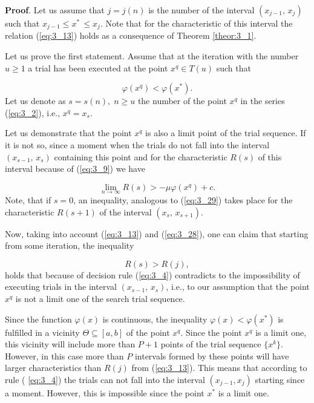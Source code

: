 	\textbf{Proof}. Let us assume that $j=j(n)$ is the number of the interval $(x_{j-1} ,\, x_{j} )$ such that $x_{j-1} \le x^{*} \, \le x_{j} $. Note that for the characteristic of this interval the relation  (\ref{eq:3_13}) holds as a consequence of Theorem \ref{theor:3_1}.
	
	Let us prove the first statement. Assume that at the iteration with the number $u\ge 1$ a trial has been executed at the point $x^{q} \in T(u)$ such that 
	
	\begin{equation}
	\label{eq:3_28}
	\varphi (x^{q} )<\varphi (x^{*} ).
	\end{equation}
	Let us denote as $s=s(n),\; n\ge u$ the number of the point $x^{q} $ in the series  (\ref{eq:3_2}), i.e., $x^{q} =x_{s} $. 
	
	Let us demonstrate that the point $x^{q} $ is also a limit point of the trial sequence. If it is not so, since a moment when the trials do not fall into the interval $(x_{s-1} ,\, x_{s} )$ containing this point and for the characteristic $R(s)$ of this interval because of  (\ref{eq:3_9}) we have
	
	\begin{equation}
	\label{eq:3_29}
	\mathop{\lim }\limits_{n\to \infty } R(s)>-\mu \varphi (x^{q} )+c.
	\end{equation}
	Note, that if $s=0$, an inequality, analogous to  (\ref{eq:3_29}) takes place for the characteristic $R(s+1)$ of the interval $(x_{s} ,\, x_{s+1} )$.
	
	Now, taking into account  (\ref{eq:3_13}) and  (\ref{eq:3_28}), one can claim that starting from some iteration, the inequality
	
	\begin{equation*}
	R(s)>R(j),
	\end{equation*}
	holds that because of decision rule  (\ref{eq:3_4}) contradicts to the impossibility of  executing trials in the interval $(x_{s-1} ,\, x_s)$, i.e., to our assumption that the point $x^q $ is not a limit one of the search trial sequence.
	
	Since the function $\varphi (x)$ is  continuous, the inequality $\varphi (x)<\varphi (x^{*} )$ is fulfilled in a vicinity $\Theta \subseteq [a,b]$ of the point $x^q$. Since the point $x^{q} $ is a limit one, this vicinity will include more than $P+1$ points of the trial sequence $\{ x^k \} $. However, in this case more than $P$ intervals formed by these points will have larger characteristics than $R(j)$ from  (\ref{eq:3_13}). This means that according to rule ( \ref{eq:3_4}) the trials can not fall into the interval $(x_{j-1} , x_j )$ starting since a moment. However, this is impossible since the point $x^{*} $ is a limit one.
	
